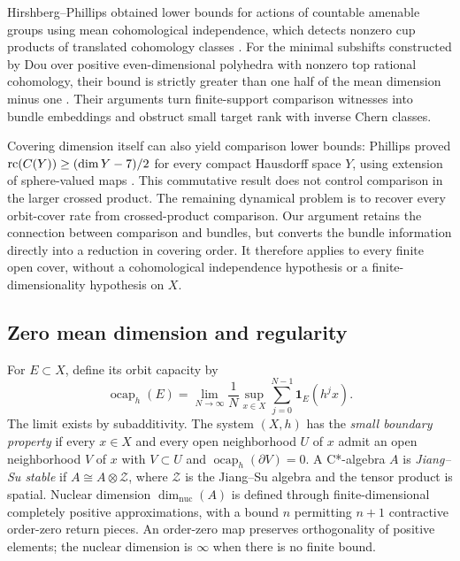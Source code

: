 Hirshberg--Phillips obtained lower bounds for actions of countable
amenable groups using mean cohomological independence, which detects
nonzero cup products of translated cohomology classes
\cite[Theorems~3.3 and~4.5 in the author preprint]{HirshbergPhillips2022}.
For the minimal subshifts constructed by Dou \cite[Section~4]{Dou2017} over positive
even-dimensional polyhedra with nonzero top rational cohomology, their
bound is strictly greater than one half of the mean dimension minus one
\cite[Corollary~4.6 in the author preprint]{HirshbergPhillips2022}.
Their arguments turn finite-support comparison witnesses into bundle
embeddings and obstruct small target rank with inverse Chern classes.

Covering dimension itself can also yield comparison lower bounds:
Phillips proved $\operatorname{rc}(C(Y))\ge(\dim Y-7)/2$ for every compact Hausdorff
space $Y$, using extension of sphere-valued maps
\cite[Corollary~3.4]{Phillips2023}.
This commutative result does not control comparison in the larger
crossed product. The remaining dynamical problem is to recover every
orbit-cover rate from crossed-product comparison. Our argument retains
the connection between comparison and bundles, but converts the bundle
information directly into a reduction in covering order. It therefore
applies to every finite open cover, without a cohomological independence
hypothesis or a finite-dimensionality hypothesis on $X$.

\subsection{Zero mean dimension and regularity}

For \(E\subset X\), define its orbit capacity by
\[
\operatorname{ocap}_h(E)=\lim_{N\to\infty}\frac1N\sup_{x\in X}
   \sum_{j=0}^{N-1}\mathbf 1_E(h^jx).
\]
The limit exists by subadditivity. The system \((X,h)\) has the
\emph{small boundary property} if every \(x\in X\) and every open
neighborhood \(U\) of \(x\) admit an open neighborhood \(V\) of \(x\)
with \(V\subset U\) and \(\operatorname{ocap}_h(\partial V)=0\).
A C*-algebra \(A\) is \emph{Jiang--Su stable} if
\(A\cong A\otimes\mathcal Z\), where \(\mathcal Z\) is the Jiang--Su
algebra and the tensor product is spatial. Nuclear dimension
\(\dim_{\mathrm{nuc}}(A)\) is defined through finite-dimensional
completely positive approximations, with a bound \(n\) permitting
\(n+1\) contractive order-zero return pieces. An order-zero map
preserves orthogonality of positive elements; the nuclear dimension is
\(\infty\) when there is no finite bound.

